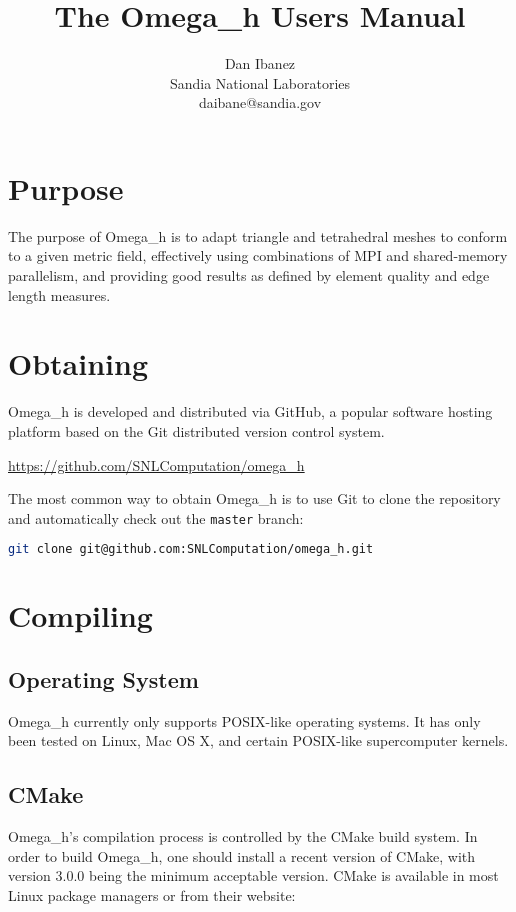 \documentclass{article}
\title{The Omega\_h Users Manual}
\author{Dan Ibanez\\
Sandia National Laboratories\\
daibane@sandia.gov}
\begin{document}
\maketitle

\section{Purpose}

The purpose of Omega\_h is to adapt triangle and tetrahedral
meshes to conform to a given metric field,
effectively using combinations of MPI and shared-memory parallelism,
and providing good results as defined by element quality and
edge length measures.

\section{Obtaining}

Omega\_h is developed and distributed via GitHub,
a popular software hosting platform based on the
Git distributed version control system.

\url{https://github.com/SNLComputation/omega_h}

The most common way to obtain Omega\_h is to
use Git to clone the repository and automatically
check out the \texttt{master} branch:

\begin{lstlisting}[language=bash]
git clone git@github.com:SNLComputation/omega_h.git
\end{lstlisting}

\section{Compiling}

\subsection{Operating System}

Omega\_h currently only supports POSIX-like operating systems.
It has only been tested on Linux, Mac OS X, and certain POSIX-like
supercomputer kernels.

\subsection{CMake}

Omega\_h's compilation process is controlled by the CMake
build system.
In order to build Omega\_h, one should install a recent
version of CMake, with version 3.0.0 being the minimum
acceptable version.
CMake is available in most Linux package managers
or from their website:
\end{document}
